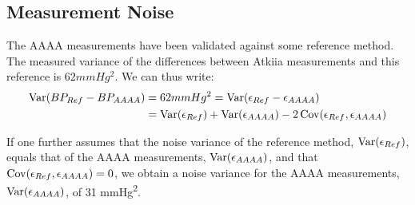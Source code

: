 \subsection{Measurement Noise}

The AAAA measurements have been validated against some
reference method.
The measured variance of the differences between Atkiia measurements
and this reference is $62 mmHg^2$.
We can thus write:
\begin{align*}
    \operatorname{Var}(BP_{Ref} - BP_{AAAA})
    & = 62 mmHg^2 = \operatorname{Var}(\epsilon_{Ref} - \epsilon_{AAAA}) \\
    & = \operatorname{Var}(\epsilon_{Ref}) + \operatorname{Var}(\epsilon_{AAAA}) - 2\operatorname{Cov}(\epsilon_{Ref},
    \epsilon_{AAAA})
\end{align*}

If one further assumes that the noise variance of the reference method,
$\operatorname{Var}(\epsilon_{Ref})$, equals that of the AAAA measurements, $\operatorname{Var}(\epsilon_{AAAA})$,
and that $\operatorname{Cov}(\epsilon_{Ref}, \epsilon_{AAAA})=0$, we obtain a noise variance
for the AAAA measurements,
$\operatorname{Var}(\epsilon_{AAAA})$, of 31 mmHg\textsuperscript{2}.



